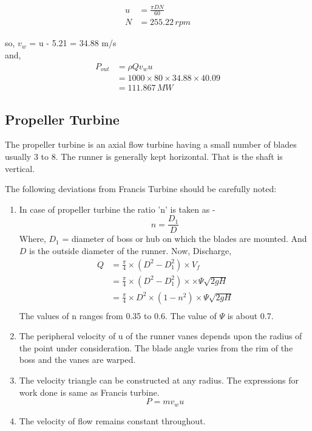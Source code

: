 \documentclass{article}
\begin{document}
\begin{multicols}{2}
  \begin{align}
    u &= \frac{\pi D N}{60} \\
    N &= 255.22 \, rpm
  \end{align}
  
  so, $v_w$ = u - 5.21 = 34.88 m/s \\
  and, 
  \begin{align*}
    P_{out} &= \rho Q v_w  u \\
    &= 1000 \times 80 \times 34.88 \times 40.09 \\
    &= 111.867 \, MW
  \end{align*}
\end{multicols}
\pagebreak
\subsection*{Propeller Turbine}
\begin{multicols}{2}
  The propeller turbine is an axial flow turbine having a small number of blades usually 3 to 8. The runner is generally kept horizontal. That is the shaft is vertical.
  
  The following deviations from Francis Turbine should be carefully noted:\\

  \begin{enumerate}
    \item In case of propeller turbine the ratio 'n' is taken as - $$n = \frac{D_1}{D}$$ Where, $D_1$ = diameter of boss or hub on which the blades are mounted. And $D$ is the outside diameter of the runner.
    Now, Discharge, 
    \begin{align*}
      Q &= \frac{\pi}{4} \times (D^2 - D_1^2) \times V_f \\
      &= \frac{\pi}{4} \times (D^2 - D_1^2) \times \times \Psi \sqrt{2gH} \\
      &= \frac{\pi}{4} \times D^2 \times ( 1 - n^2) \times \Psi \sqrt{2gH} \\
    \end{align*} 
    The values of n ranges from 0.35 to 0.6. The value of $\Psi$ is about 0.7. 

    \item The peripheral velocity of u of the runner vanes depends upon the radius of the point under consideration. The blade angle varies from the rim of the boss and the vanes are warped. 
    \item The velocity triangle can be constructed at any radius. The expressions for work done is same as Francis turbine. 
    $$P = m v_w u $$

    \item The velocity of flow remains constant throughout.
  \end{enumerate}

\end{multicols}
\end{document}
